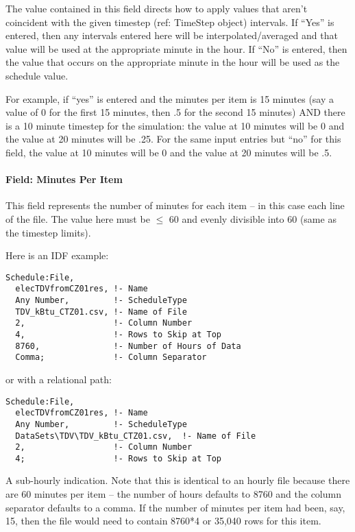 The value contained in this field directs how to apply values that aren't coincident with the given timestep (ref: TimeStep object) intervals. If ``Yes'' is entered, then any intervals entered here will be interpolated/averaged and that value will be used at the appropriate minute in the hour. If ``No'' is entered, then the value that occurs on the appropriate minute in the hour will be used as the schedule value.

For example, if ``yes'' is entered and the minutes per item is 15 minutes (say a value of 0 for the first 15 minutes, then .5 for the second 15 minutes) AND there is a 10 minute timestep for the simulation: the value at 10 minutes will be 0 and the value at 20 minutes will be .25. For the same input entries but ``no'' for this field, the value at 10 minutes will be 0 and the value at 20 minutes will be .5.

\paragraph{Field: Minutes Per Item}\label{field-minutes-per-item-1}

This field represents the number of minutes for each item -- in this case each line of the file. The value here must be \(\le\) 60 and evenly divisible into 60 (same as the timestep limits).

Here is an IDF example:

\begin{lstlisting}
Schedule:File,
  elecTDVfromCZ01res, !- Name
  Any Number,         !- ScheduleType
  TDV_kBtu_CTZ01.csv, !- Name of File
  2,                  !- Column Number
  4,                  !- Rows to Skip at Top
  8760,               !- Number of Hours of Data
  Comma;              !- Column Separator
\end{lstlisting}

or with a relational path:

\begin{lstlisting}
Schedule:File,
  elecTDVfromCZ01res, !- Name
  Any Number,         !- ScheduleType
  DataSets\TDV\TDV_kBtu_CTZ01.csv,  !- Name of File
  2,                  !- Column Number
  4;                  !- Rows to Skip at Top
\end{lstlisting}

A sub-hourly indication. Note that this is identical to an hourly file because there are 60 minutes per item -- the number of hours defaults to 8760 and the column separator defaults to a comma. If the number of minutes per item had been, say, 15, then the file would need to contain 8760*4 or 35,040 rows for this item.

